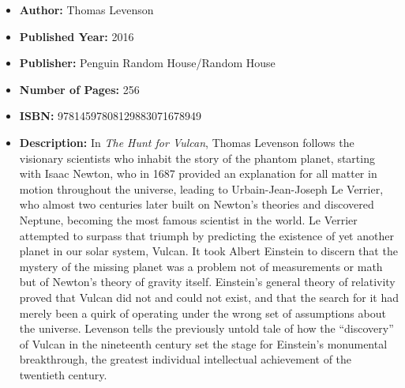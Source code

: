 \documentclass{tufte-handout}
\begin{document}
\begin{itemize}
    \item[] \textbf{Author:} Thomas Levenson
    \item[] \textbf{Published Year:} 2016
    \item[] \textbf{Publisher:} Penguin Random House/Random House
    \item[] \textbf{Number of Pages:} 256    
    \item[] \textbf{ISBN:} 97814597808129883071678949
    \item[] \textbf{Description:} In \textit{The Hunt for Vulcan}, Thomas Levenson follows the visionary scientists who inhabit the story of the phantom planet, starting with Isaac Newton, who in 1687 provided an explanation for all matter in motion throughout the universe, leading to Urbain-Jean-Joseph Le Verrier, who almost two centuries later built on Newton’s theories and discovered Neptune, becoming the most famous scientist in the world. Le Verrier attempted to surpass that triumph by predicting the existence of yet another planet in our solar system, Vulcan. It took Albert Einstein to discern that the mystery of the missing planet was a problem not of measurements or math but of Newton’s theory of gravity itself. Einstein’s general theory of relativity proved that Vulcan did not and could not exist, and that the search for it had merely been a quirk of operating under the wrong set of assumptions about the universe. Levenson tells the previously untold tale of how the “discovery” of Vulcan in the nineteenth century set the stage for Einstein’s monumental breakthrough, the greatest individual intellectual achievement of the twentieth century.
\end{itemize}
\end{document}
